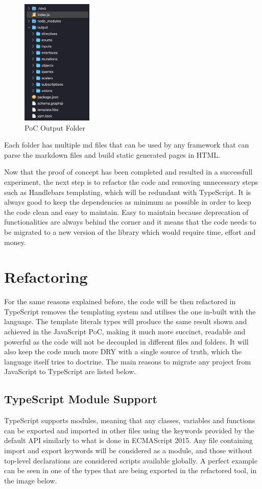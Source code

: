\begin{figure}[H]
  \centering
  \includegraphics[width=0.3\textwidth]{figures/folders}
  \caption{PoC Output Folder}
  \label{f:ch5-poc-output-folder}
\end{figure}

Each folder has multiple md files that can be used by any framework that can
parse the markdown files and build static generated pages in HTML.

Now that the proof of concept has been completed and resulted in a successfull
experiment, the next step is to refactor the code and removing unnecessary steps
such as Handlebars templating, which will be redundant with TypeScript. It is
always good to keep the dependencies as minimum as possible in order to keep the
code clean and easy to maintain. Easy to maintain because deprecation of
functionalities are always behind the corner and it means that the code needs to
be migrated to a new version of the library which would require time, effort and
money.

\section{Refactoring}
\label{s:Refactoring}
For the same reasons explained before, the code will be then refactored in
TypeScript removes the templating system and utilises the one in-built with the
language. The template literals types will produce the same result shown and
achieved in the JavaScript PoC, making it much more succinct, readable and
powerful as the code will not be decoupled in different files and folders. It
will also keep the code much more DRY with a single source of truth, which the
language itself tries to doctrine. The main reasons to migrate any project from
JavaScript to TypeScript are listed below.

\subsection{TypeScript Module Support}
\label{ss:TypeScript-Module-Support}
TypeScript supports modules, meaning that any classes, variables and functions
can be exported and imported in other files using the keywords provided by the
default API similarly to what is done in ECMAScript 2015. Any file containing
import and export keywords will be considered as a module, and those without
top-level declarations are considered scripts available globally. A perfect
example can be seen in one of the types that are being exported in the
refactored tool, in the image below.

